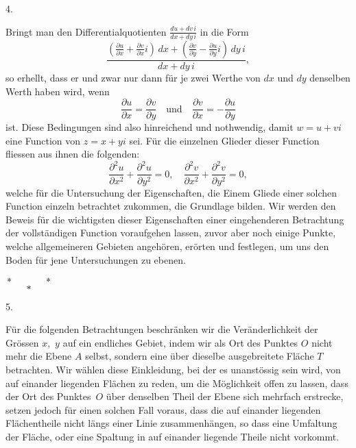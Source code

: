 \documentclass[a4paper,12pt]{article}
\newcommand{\asterisktriangle}{\centerline{${\displaystyle
   * \hskip 36pt * \atop \displaystyle *}$}}
\begin{document}
\medbreak

\centerline{4.}

\nobreak\medskip

Bringt man den Differentialquotienten
$\displaystyle \frac{du + dv \, i}{dx + dy \, i}$
in die Form
\[ \frac{\displaystyle
         \left(
            \frac{\partial u}{\partial x}
          + \frac{\partial v}{\partial x} i
         \right) \, dx
       + \left(
            \frac{\partial v}{\partial y}
          - \frac{\partial u}{\partial y} i
         \right) \, dy \, i}{dx + dy \, i},\]
so erhellt, dass er und zwar nur dann f\"{u}r je zwei Werthe von
$dx$ und $dy$ denselben Werth haben wird, wenn
\[       \frac{\partial u}{\partial x}
   =     \frac{\partial v}{\partial y}
      \quad \mbox{und} \quad
         \frac{\partial v}{\partial x}
   =   - \frac{\partial u}{\partial y} \]
ist.  Diese Bedingungen sind also hinreichend und nothwendig,
damit $w = u + vi$ eine Function von $z = x + yi$ sei.  F\"{u}r
die einzelnen Glieder dieser Function fliessen aus ihnen die
folgenden:
\[    \frac{\partial^2 u}{\partial x^2}
    + \frac{\partial^2 u}{\partial y^2}
   = 0,\quad
      \frac{\partial^2 v}{\partial x^2}
    + \frac{\partial^2 v}{\partial y^2}
   = 0,\]
welche f\"{u}r die Untersuchung der Eigenschaften, die Einem
Gliede einer solchen Function einzeln betrachtet zukommen, die
Grundlage bilden.  Wir werden den Beweis f\"{u}r die wichtigsten
dieser Eigenschaften einer eingehenderen Betrachtung der
vollst\"{a}ndigen Function voraufgehen lassen, zuvor aber noch
einige Punkte, welche allgemeineren Gebieten angeh\"{o}ren,
er\"{o}rten und festlegen, um uns den Boden f\"{u}r jene
Untersuchungen zu ebenen.

\nobreak\medskip

\asterisktriangle

\medbreak

\centerline{5.}

\nobreak\medskip

F\"{u}r die folgenden Betrachtungen beschr\"{a}nken wir die
Ver\"{a}nderlichkeit der Gr\"{o}ssen $x$,~$y$ auf ein endliches
Gebiet, indem wir als Ort des Punktes $O$ nicht mehr die Ebene
$A$ selbst, sondern eine \"{u}ber dieselbe ausgebreitete
Fl\"{a}che $T$ betrachten.  Wir w\"{a}hlen diese Einkleidung, bei
der es unanst\"{o}ssig sein wird, von auf einander liegenden
Fl\"{a}chen zu reden, um die M\"{o}glichkeit offen zu lassen,
dass der Ort des Punktes~$O$ \"{u}ber denselben Theil der
Ebene sich mehrfach erstrecke, setzen jedoch f\"{u}r einen solchen
Fall voraus, dass die auf einander liegenden Fl\"{a}chentheile
nicht l\"{a}ngs einer Linie zusammenh\"{a}ngen, so dass eine
Umfaltung der Fl\"{a}che, oder eine Spaltung in auf einander
liegende Theile nicht vorkommt.
\end{document}
